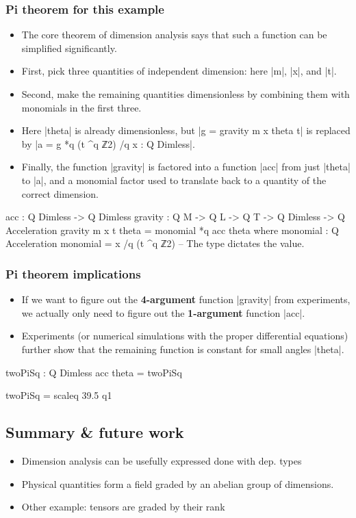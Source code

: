 \documentclass{article}
\begin{document}
\subsubsection{Pi theorem for this example}
\label{sec:org4a22469}
\begin{itemize}
\item The core theorem of dimension analysis says that such a function can
be simplified significantly.
\item First, pick three quantities of independent dimension:
here |m|, |x|, and |t|.
\item Second, make the remaining quantities dimensionless by combining
them with monomials in the first three.
\item Here |theta| is already dimensionless, but |g = gravity m x theta t|
is replaced by |a = g *q (t ^q ℤ2) /q x : Q Dimless|.
\item Finally, the function |gravity| is factored into a function |acc|
from just |theta| to |a|, and a monomial factor used to translate
back to a quantity of the correct dimension.
\end{itemize}
\begin{code}
  acc : Q Dimless -> Q Dimless
  gravity : Q M -> Q L -> Q T -> Q Dimless -> Q Acceleration
  gravity m x t theta = monomial  *q  acc theta
    where  monomial : Q Acceleration 
           monomial = x /q (t ^q ℤ2) -- The type dictates the value.
\end{code}
\subsubsection{Pi theorem implications}
\label{sec:orgb2d1435}
\begin{itemize}
\item If we want to figure out the \textbf{4-argument} function |gravity| from
experiments, we actually only need to figure out the \textbf{1-argument}
function |acc|.
\item Experiments (or numerical simulations with the proper differential
equations) further show that the remaining function is constant for
small angles |theta|.
\end{itemize}

\begin{code}
  twoPiSq : Q Dimless
  acc theta = twoPiSq

  twoPiSq = scaleq 39.5 q1
\end{code}

\subsection{Summary \& future work}
\label{sec:org51e8638}
\begin{itemize}
\item Dimension analysis can be usefully expressed done with dep. types
\item Physical quantities form a field graded by an abelian group of
dimensions.
\item Other example: tensors are graded by their rank
\end{itemize}
\end{document}

